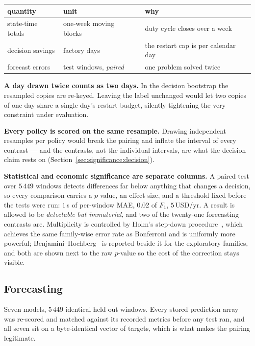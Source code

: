 \begin{center}
\small
\begin{tabular}{@{}lll@{}}
\toprule
quantity & unit & why \\
\midrule
state-time totals & one-week moving blocks~\cite{kunsch1989jackknife}
  & duty cycle closes over a week \\
decision savings & factory days
  & the restart cap is per calendar day \\
forecast errors & test windows, \emph{paired}
  & one problem solved twice \\
\bottomrule
\end{tabular}
\end{center}

\textbf{A day drawn twice counts as two days.} In the decision bootstrap
the resampled copies are re-keyed. Leaving the label unchanged would let
two copies of one day share a single day's restart budget, silently
tightening the very constraint under evaluation.

\textbf{Every policy is scored on the same resample.} Drawing
independent resamples per policy would break the pairing and inflate the
interval of every contrast --- and the contrasts, not the individual
intervals, are what the decision claim rests on
(Section~\ref{sec:significance:decision}).

\textbf{Statistical and economic significance are separate columns.} A
paired test over $5\,449$ windows detects differences far below anything
that changes a decision, so every comparison carries a $p$-value, an
effect size, and a threshold fixed before the tests were run: $1$\,s of
per-window MAE, $0.02$ of $F_1$, $5$\,USD/yr. A result is allowed to be
\emph{detectable but immaterial}, and two of the twenty-one forecasting
contrasts are. Multiplicity is controlled by Holm's step-down
procedure~\cite{holm1979simple}, which achieves the same family-wise
error rate as Bonferroni and is uniformly more powerful;
Benjamini--Hochberg~\cite{benjamini1995controlling} is reported beside
it for the exploratory families, and both are shown next to the raw
$p$-value so the cost of the correction stays visible.

\subsection{Forecasting}
\label{sec:significance:forecast}

Seven models, $5\,449$ identical held-out windows. Every stored
prediction array was re-scored and matched against its recorded metrics
before any test ran, and all seven sit on a byte-identical vector of
targets, which is what makes the pairing legitimate.

